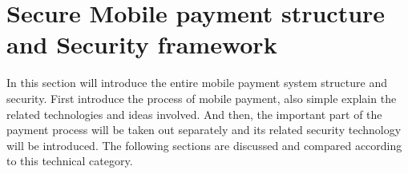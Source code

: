 \documentclass[journal]{IEEEtran}
\begin{document}
%


\section{Secure Mobile payment structure and Security framework}
In this section will introduce the entire mobile payment system structure and security. First introduce the process of mobile payment, also simple explain the related technologies and ideas involved. And then, the important part of the payment process will be taken out separately and its related security technology will be introduced. The following sections are discussed and compared according to this technical category.
\end{document}
